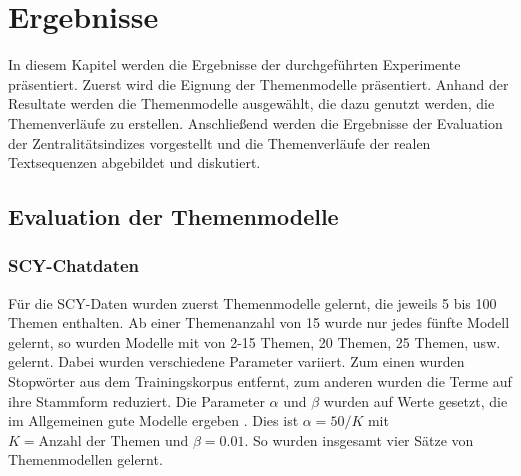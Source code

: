 \chapter{Ergebnisse}
\label{chap:results}
In diesem Kapitel werden die Ergebnisse der durchgeführten Experimente präsentiert. Zuerst wird die Eignung der Themenmodelle präsentiert. Anhand der Resultate werden die Themenmodelle ausgewählt, die dazu genutzt werden, die Themenverläufe zu erstellen. Anschließend werden die Ergebnisse der Evaluation der Zentralitätsindizes vorgestellt und die Themenverläufe der realen Textsequenzen abgebildet und diskutiert.  

\section{Evaluation der Themenmodelle}
\label{sec:tmValResults}

\subsection{SCY-Chatdaten}
Für die SCY-Daten wurden zuerst Themenmodelle gelernt, die jeweils 5 bis 100 Themen enthalten. Ab einer Themenanzahl von 15 wurde nur jedes fünfte Modell gelernt, so wurden Modelle mit von 2-15 Themen, 20 Themen, 25 Themen, usw. gelernt. Dabei wurden verschiedene Parameter variiert. Zum einen wurden Stopwörter aus dem Trainingskorpus entfernt, zum anderen wurden die Terme auf ihre Stammform reduziert. Die Parameter $\alpha$ und $\beta$ wurden auf Werte gesetzt, die im Allgemeinen gute Modelle ergeben \citep{Griffiths2004LDA}. Dies ist $\alpha=50/K$ mit $K = \text{Anzahl der Themen}$ und $\beta=0.01$. So wurden insgesamt vier Sätze von Themenmodellen gelernt.  

